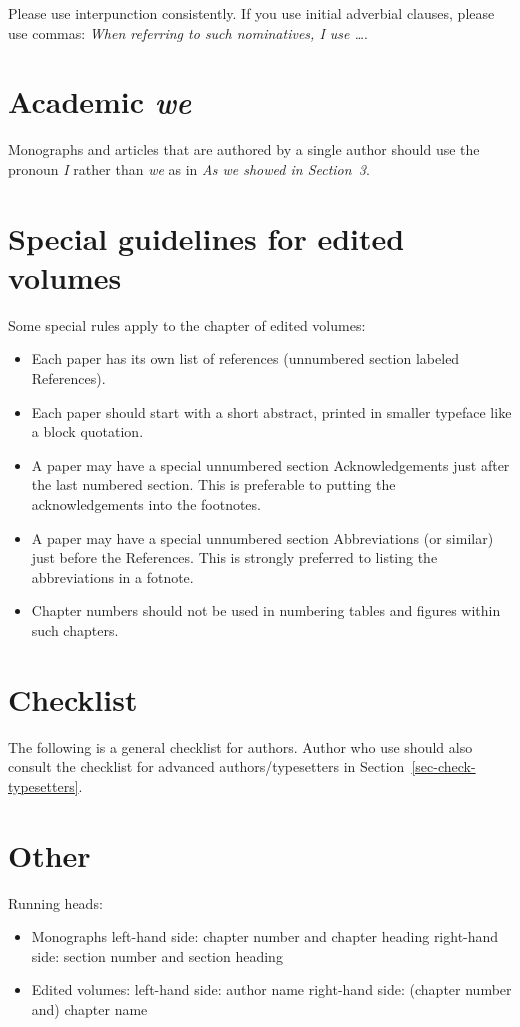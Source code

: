 Please use interpunction consistently. If you use initial adverbial clauses, please use commas:
\emph{When referring to such nominatives, I use \ldots}.


\section{Academic \emph{we}}

Monographs and articles that are authored by a single author should use the pronoun \emph{I} rather
than \emph{we} as in \emph{As we showed in Section~3}.

\section{Special guidelines for edited volumes}


Some special rules apply to the chapter of edited volumes:
\begin{itemize}
\item Each paper has its own list of references (unnumbered section labeled References).
\item Each paper should start with a short abstract, printed in smaller typeface like a block quotation.
\item A paper may have a special unnumbered section Acknowledgements just after the last numbered section. This is preferable to putting the acknowledgements into the footnotes.
\item A paper may have a special unnumbered section Abbreviations (or similar) just before the References. This is strongly preferred to listing the abbreviations in a fotnote.
\item Chapter numbers should not be used in numbering tables and figures within such chapters.
\end{itemize}


\section{Checklist}

The following is a general checklist for authors. Author who use \latex should also consult the
checklist for advanced authors/typesetters in Section~\ref{sec-check-typesetters}.



\section{Other}

Running heads:
\begin{itemize}
\item Monographs
left-hand side: chapter number and chapter heading 
right-hand side: section number and section heading
\item Edited volumes:
left-hand side: author name
right-hand side: (chapter number and) chapter name
\end{itemize}














